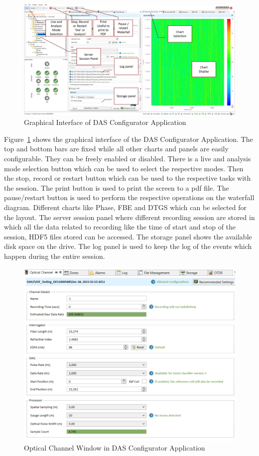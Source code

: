 \begin{figure}[h]
    \centering
    \includegraphics[width=\linewidth]{Bilder/jpg/DAS_config.jpg}
    \caption{Graphical Interface of DAS Configurator Application~\cite{DAS_Configurator_Manual}}
    \label{config}
\end{figure}

Figure~\ref{config} shows the graphical interface of the DAS Configurator Application. The top and bottom bars are fixed while all other charts and panels are easily configurable. They can be freely enabled or disabled. There is a live and analysis mode selection button which can be used to select the respective modes. Then the stop, record or restart button which can be used to the respective tasks with the session. The print button is used to print the screen to a pdf file. The pause/restart button is used to perform the respective operations on the waterfall diagram. Different charts like Phase, FBE and DTGS which can be selected for the layout. The server session panel where different recording session are stored in which all the data related to recording like the time of start and stop of the session, HDF5 files stored can be accessed. The storage panel  shows the available disk space on the drive. The log panel is used to keep the log of the events which happen during the entire session. 

\begin{figure}[h]
    \centering
    \includegraphics[width=0.8\linewidth]{Bilder/jpg/optical_channel.png}
    \caption{Optical Channel Window in DAS Configurator Application}
    \label{optical}
\end{figure}

